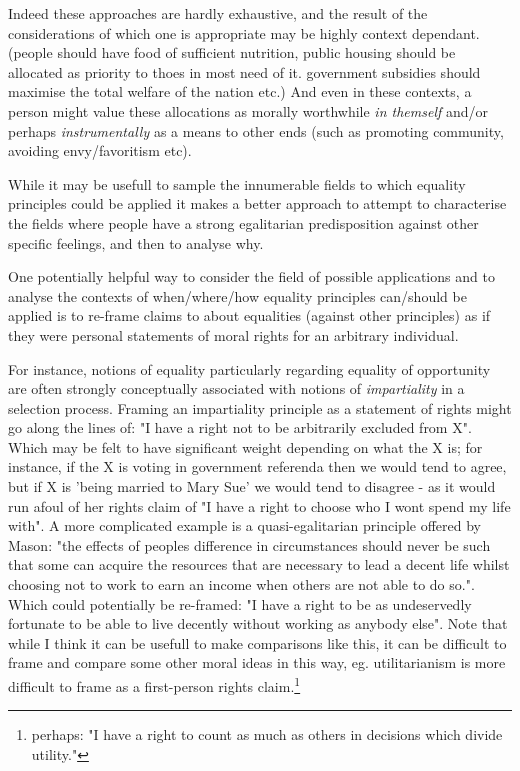 \documentclass{article}
\begin{document}
Indeed these approaches are hardly exhaustive, and the result of the considerations of which one is appropriate may be highly context dependant. (people should have food of sufficient nutrition, public housing should be allocated as priority to thoes in most need of it. government subsidies should maximise the total welfare of the nation etc.) 
And even in these contexts, a person might value these allocations as morally worthwhile \textit{in themself} and/or perhaps \textit{instrumentally} as a means to other ends (such as promoting community, avoiding envy/favoritism etc).

While it may be usefull to sample the innumerable fields to which equality principles could be applied it makes a better approach to attempt to characterise the fields where people have a strong egalitarian predisposition against other specific feelings, and then to analyse why.



One potentially helpful way to consider the field of possible applications and to analyse the contexts of when/where/how equality principles can/should be applied is to re-frame claims to about equalities (against other principles) as if they were personal statements of moral rights for an arbitrary individual.

For instance, notions of equality particularly regarding equality of opportunity are often strongly conceptually associated with notions of \textit{impartiality} in a selection process.
Framing an impartiality principle as a statement of rights might go along the lines of: "I have a right not to be arbitrarily excluded from X".
Which may be felt to have significant weight depending on what the X is; for instance, if the X is voting in government referenda then we would tend to agree, but if X is 'being married to Mary Sue' we would tend to disagree - as it would run afoul of her rights claim of "I have a right to choose who I wont spend my life with".
A more complicated example is a quasi-egalitarian principle offered by Mason: "the effects of peoples difference in circumstances should never be such that some can acquire the resources that are necessary to lead a decent life whilst choosing not to work to earn an income when others are not able to do so.". Which could potentially be re-framed: "I have a right to be as undeservedly fortunate to be able to live decently without working as anybody else".
Note that while I think it can be usefull to make comparisons like this, it can be difficult to frame and compare some other moral ideas in this way, eg. utilitarianism is more difficult to frame as a first-person rights claim.\footnote{perhaps: "I have a right to count as much as others in decisions which divide utility."}
\end{document}
